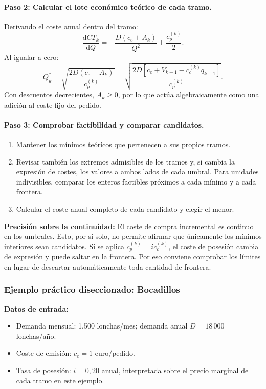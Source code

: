 \documentclass[11pt,a4paper]{article}
\begin{document}
\paragraph{Paso 2: Calcular el lote económico teórico de cada tramo.}
Derivando el coste anual dentro del tramo:
\[
    \frac{\mathrm{d}CT_k}{\mathrm{d}Q}
    =-\frac{D(c_e+A_k)}{Q^2}+\frac{c_p^{(k)}}{2}.
\]
Al igualar a cero:
\[
    Q_k^{*}
    =\sqrt{\frac{2D(c_e+A_k)}{c_p^{(k)}}}
    =\sqrt{\frac{2D\left[c_e+V_{k-1}-c_c^{(k)}q_{k-1}\right]}
    {c_p^{(k)}}}.
\]
Con descuentos decrecientes, $A_k\geq0$, por lo que actúa algebraicamente como una adición al coste fijo del pedido.

\paragraph{Paso 3: Comprobar factibilidad y comparar candidatos.}
\begin{enumerate}
    \item Mantener los mínimos teóricos que pertenecen a sus propios tramos.
    \item Revisar también los extremos admisibles de los tramos y, si cambia la expresión de costes, los valores a ambos lados de cada umbral. Para unidades indivisibles, comparar los enteros factibles próximos a cada mínimo y a cada frontera.
    \item Calcular el coste anual completo de cada candidato y elegir el menor.
\end{enumerate}
\textbf{Precisión sobre la continuidad:} El coste de compra incremental es continuo en los umbrales. Esto, por sí solo, no permite afirmar que únicamente los mínimos interiores sean candidatos. Si se aplica $c_p^{(k)}=i c_c^{(k)}$, el coste de posesión cambia de expresión y puede saltar en la frontera. Por eso conviene comprobar los límites en lugar de descartar automáticamente toda cantidad de frontera.

\subsubsection{Ejemplo práctico diseccionado: Bocadillos}
\textbf{Datos de entrada:}
\begin{itemize}
    \item Demanda mensual: 1.500 lonchas/mes; demanda anual $D=18\,000$ lonchas/año.
    \item Coste de emisión: $c_e=1$ euro/pedido.
    \item Tasa de posesión: $i=0{,}20$ anual, interpretada sobre el precio marginal de cada tramo en este ejemplo.
\end{itemize}
\end{document}
